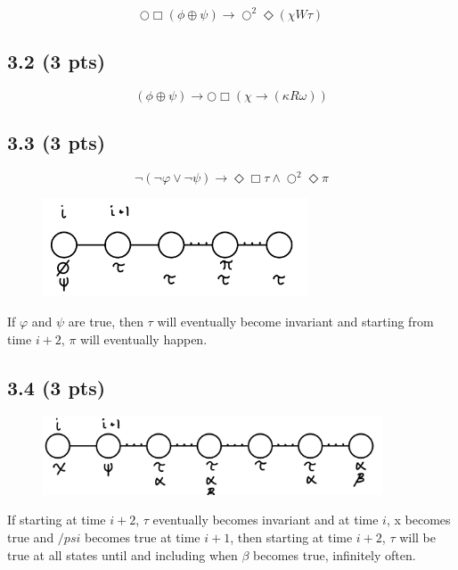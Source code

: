 \documentclass[12pt]{article}
\begin{document}
\begin{equation*}
    \bigcirc \Box (\phi \oplus \psi) \rightarrow \bigcirc^2 \Diamond (\chi W \tau)
\end{equation*}

\subsection*{3.2 (3 pts)}


\begin{equation*}
    (\phi \oplus \psi) \rightarrow \bigcirc \Box (\chi \rightarrow (\kappa R \omega))
\end{equation*}

\subsection*{3.3 (3 pts)}
\begin{equation*}
    \neg (\neg \varphi \vee \neg \psi) \rightarrow \Diamond \Box \tau \land \bigcirc^2 \Diamond \pi
\end{equation*}

\begin{figure}[h]
    \centering
    \includegraphics[width=0.7\textwidth]{images/3.3}
\end{figure}

If $\varphi$ and $\psi$ are true, then $\tau$ will eventually become invariant and starting from time $i+2$, $\pi$ will eventually happen.

\subsection*{3.4 (3 pts)}
\begin{figure}[h]
    \centering
    \includegraphics[width=0.9\textwidth]{images/3.4}
\end{figure}
If starting at time $i+2$, $\tau$ eventually becomes invariant and at time $i$, x becomes true and $/psi$ becomes true at time $i+1$, then starting at time $i+2$, $\tau$ will be true at all states until and including when $\beta$ becomes true, infinitely often. 
\end{document}

